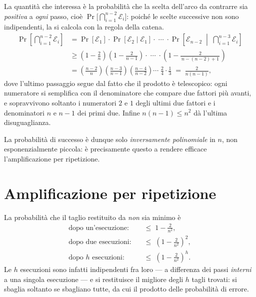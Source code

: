 \begin{dimostrazione*}
La quantità che interessa è la probabilità che la scelta dell'arco da contrarre sia
\emph{positiva} a \emph{ogni} passo, cioè $\Pr\bigl[\bigcap_{i=1}^{n-2}\mathcal{E}_i\bigr]$:
poiché le scelte successive non sono indipendenti, la si calcola con la regola della catena.
\begin{align*}
  \Pr\!\left[\bigcap_{i=1}^{n-2}\mathcal{E}_i\right]
  &= \Pr[\mathcal{E}_1]\cdot\Pr[\mathcal{E}_2\mid\mathcal{E}_1]\cdot\;\cdots\;\cdot
     \Pr\!\left[\mathcal{E}_{n-2}\;\middle|\;\bigcap_{i=1}^{n-3}\mathcal{E}_i\right]\\[4pt]
  &\ge \left(1-\frac{2}{n}\right)\left(1-\frac{2}{n-1}\right)\cdot\;\cdots\;\cdot
       \left(1-\frac{2}{\,n-(n-2)+1\,}\right)\\[4pt]
  &= \left(\frac{n-2}{n}\right)\left(\frac{n-3}{n-1}\right)\left(\frac{n-4}{n-2}\right)
     \cdots\;\frac{2}{4}\cdot\frac{1}{3}
   \;=\;\frac{2}{n(n-1)} ,
\end{align*}
dove l'ultimo passaggio segue dal fatto che il prodotto è telescopico: ogni numeratore si
semplifica con il denominatore che compare due fattori più avanti, e sopravvivono soltanto i
numeratori $2$ e $1$ degli ultimi due fattori e i denominatori $n$ e $n-1$ dei primi due.
Infine $n(n-1)\le n^{2}$ dà l'ultima disuguaglianza.
\end{dimostrazione*}

La probabilità di successo è dunque solo \emph{inversamente polinomiale} in $n$, non
esponenzialmente piccola: è precisamente questo a rendere efficace l'amplificazione per
ripetizione.

\section{Amplificazione per ripetizione}

\begin{osservazione}
La probabilità che il taglio restituito da \contract \emph{non} sia minimo è
\[
  \begin{aligned}
    \text{dopo un'esecuzione:}   &\quad \le\; 1-\frac{2}{n^{2}},\\[4pt]
    \text{dopo due esecuzioni:}  &\quad \le\; \left(1-\frac{2}{n^{2}}\right)^{\!2},\\[4pt]
    \text{dopo $h$ esecuzioni:}  &\quad \le\; \left(1-\frac{2}{n^{2}}\right)^{\!h}.
  \end{aligned}
\]
Le $h$ esecuzioni sono infatti indipendenti fra loro — a differenza dei passi \emph{interni}
a una singola esecuzione — e si restituisce il migliore degli $h$ tagli trovati: si sbaglia
soltanto se sbagliano tutte, da cui il prodotto delle probabilità di errore.
\end{osservazione}

